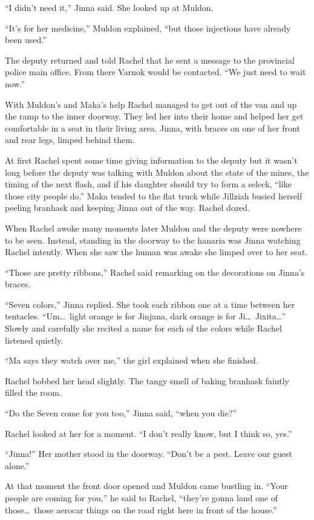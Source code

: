 ``I didn't need it,'' Jinna said. She looked up at Muldon.

``It's for her medicine,'' Muldon explained, ``but those injections have already been used.''

The deputy returned and told Rachel that he sent a message to the provincial police main office.
From there Varnok would be contacted. ``We just need to wait now.''

With Muldon's and Maka's help Rachel managed to get out of the van and up the ramp to the inner
doorway. They led her into their home and helped her get comfortable in a seat in their living
area. Jinna, with braces on one of her front and rear legs, limped behind them.

At first Rachel spent some time giving information to the deputy but it wasn't long before the
deputy was talking with Muldon about the state of the mines, the timing of the next flash, and
if his daughter should try to form a seleck, ``like those city people do.'' Maka tended to the
flat truck while Jillziah busied herself peeling branhask and keeping Jinna out of the way.
Rachel dozed.

When Rachel awoke many moments later Muldon and the deputy were nowhere to be seen. Instead,
standing in the doorway to the hanaria was Jinna watching Rachel intently. When she saw the
human was awake she limped over to her seat.

``Those are pretty ribbons,'' Rachel said remarking on the decorations on Jinna's braces.

``Seven colors,'' Jinna replied. She took each ribbon one at a time between her tentacles.
``Um\ldots\ light orange is for Jinjana, dark orange is for Ji\ldots\ Jixita\ldots'' Slowly and
carefully she recited a name for each of the colors while Rachel listened quietly.

``Ma says they watch over me,'' the girl explained when she finished.

Rachel bobbed her head slightly. The tangy smell of baking branhask faintly filled the room.

``Do the Seven come for you too,'' Jinna said, ``when you die?''

Rachel looked at her for a moment. ``I don't really know, but I think so, yes.''

``Jinna!'' Her mother stood in the doorway. ``Don't be a pest. Leave our guest alone.'' 

At that moment the front door opened and Muldon came bustling in. ``Your people are coming for
you,'' he said to Rachel, ``they're gonna land one of those\ldots\ those aerocar things on the
road right here in front of the house.''

